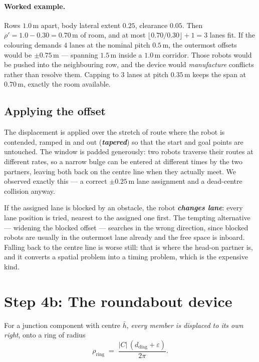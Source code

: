 \documentclass[11pt,a4paper]{article}
\newcommand{\defn}[1]{\textbf{\textit{#1}}}
\begin{document}
\paragraph{Worked example.} Rows $1.0$\,m apart, body lateral extent $0.25$, clearance
$0.05$. Then $\rho' = 1.0 - 0.30 = 0.70$\,m of room, and at most
$\lfloor 0.70/0.30 \rfloor + 1 = 3$ lanes fit. If the colouring demands $4$ lanes at the
nominal pitch $0.5$\,m, the outermost offsets would be $\pm 0.75$\,m --- spanning $1.5$\,m
inside a $1.0$\,m corridor. Those robots would be pushed into the neighbouring row, and the
device would \emph{manufacture} conflicts rather than resolve them. Capping to $3$ lanes at
pitch $0.35$\,m keeps the span at $0.70$\,m, exactly the room available.

\subsection{Applying the offset}

The displacement is applied over the stretch of route where the robot is contended, ramped
in and out (\defn{tapered}) so that the start and goal points are untouched. The window is
padded generously: two robots traverse their routes at different rates, so a narrow bulge
can be entered at different times by the two partners, leaving both back on the centre line
when they actually meet. We observed exactly this --- a correct $\pm 0.25$\,m lane
assignment and a dead-centre collision anyway.

If the assigned lane is blocked by an obstacle, the robot \defn{changes lane}: every lane
position is tried, nearest to the assigned one first. The tempting alternative --- widening
the blocked offset --- searches in the wrong direction, since blocked robots are usually in
the outermost lane already and the free space is inboard. Falling back to the centre line is
worse still: that is where the head-on partner is, and it converts a spatial problem into a
timing problem, which is the expensive kind.

\section{Step 4b: The roundabout device}
\label{sec:orbit}

For a junction component with centre $\bar{h}$, \emph{every member is displaced to its own
right}, onto a ring of radius
\begin{equation}
\rho_{\mathrm{ring}} \;=\; \frac{|C| \, (d_{\mathrm{diag}} + \varepsilon)}{2\pi}.
\label{eq:ring}
\end{equation}
\end{document}
